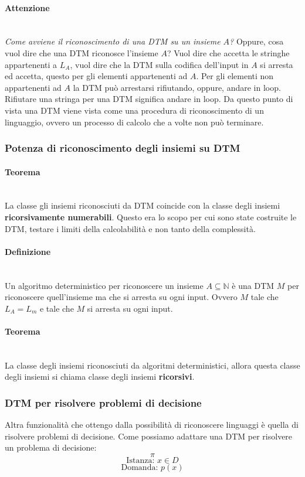 \documentclass{article}
\begin{document}
\paragraph{Attenzione}\mbox{}\\
\textit{Come avviene il riconoscimento di una DTM su un insieme $A$?} Oppure,
cosa vuol dire che una DTM riconosce l'insieme $A$?
Vuol dire che accetta le stringhe appartenenti a $L_A$, vuol dire che la DTM sulla
codifica dell'input in $A$ si arresta ed accetta, questo per gli elementi appartenenti ad $A$.
Per gli elementi non appartenenti ad $A$ la DTM può arrestarsi rifiutando, oppure, andare in loop.
Rifiutare una stringa per una DTM significa andare in loop. Da questo punto di vista una DTM
viene vista come una procedura di riconoscimento di un linguaggio, ovvero un processo
di calcolo che a volte non può terminare.

\subsubsection{Potenza di riconoscimento degli insiemi su DTM}
\paragraph{Teorema}\mbox{}\\
La classe gli insiemi riconosciuti da DTM coincide con la classe degli insiemi
\textbf{ricorsivamente numerabili}. Questo era lo scopo per cui sono state costruite
le DTM, testare i limiti della calcolabilità e non tanto della complessità.

\paragraph{Definizione}\mbox{}\\
Un algoritmo deterministico per riconoscere un insieme $A\subseteq\mathbb{N}$ è una DTM $M$
per riconoscere quell'insieme ma che si arresta su ogni input. Ovvero $M$ tale che
$L_A=L_m$ e tale che $M$ si arresta su ogni input.

\paragraph{Teorema}\mbox{}\\
La classe degli insiemi riconosciuti da algoritmi deterministici, allora questa classe
degli insiemi si chiama classe degli insiemi \textbf{ricorsivi}.

\subsubsection{DTM per risolvere problemi di decisione}
Altra funzionalità che ottengo dalla possibilità di riconoscere linguaggi è quella
di risolvere problemi di decisione.
Come possiamo adattare una DTM per risolvere un problema di decisione:
$$\pi$$
$$\text{Istanza: } x\in D$$
$$\text{Domanda: }p(x)$$
\end{document}
